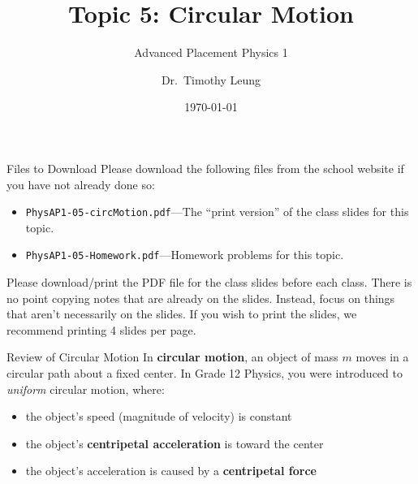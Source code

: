 \documentclass[12pt,compress,aspectratio=169]{beamer}
\title{Topic 5: Circular Motion}
\subtitle{Advanced Placement Physics 1}
\author[TML]{Dr.\ Timothy Leung}
\institute{Olympiads School}
\date{\today}
\begin{document}
\begin{frame}
  \maketitle
\end{frame}


\begin{frame}{Files to Download}
  Please download the following files from the school website if you have not
  already done so:
  \begin{itemize}
  \item\texttt{PhysAP1-05-circMotion.pdf}---The ``print version'' of the
    class slides for this topic.
  \item\texttt{PhysAP1-05-Homework.pdf}---Homework problems for this topic.
  \end{itemize}
  \vspace{.1in}Please download/print the PDF file for the class slides before
  each class. There is no point copying notes that are already on the slides.
  Instead, focus on things that aren't necessarily on the slides. If you wish
  to print the slides, we recommend printing 4 slides per page.
\end{frame}



\begin{frame}{Review of Circular Motion}
  In \textbf{circular motion}, an object of mass $m$ moves in a circular path
  about a fixed center. In Grade 12 Physics, you were introduced to
  \emph{uniform} circular motion, where:
  \begin{itemize}
  \item the object's speed (magnitude of velocity) is constant
  \item the object's \textbf{centripetal acceleration} is toward the center
  \item the object's acceleration is caused by a \textbf{centripetal force}
  \end{itemize}
\end{frame}
\end{document}

